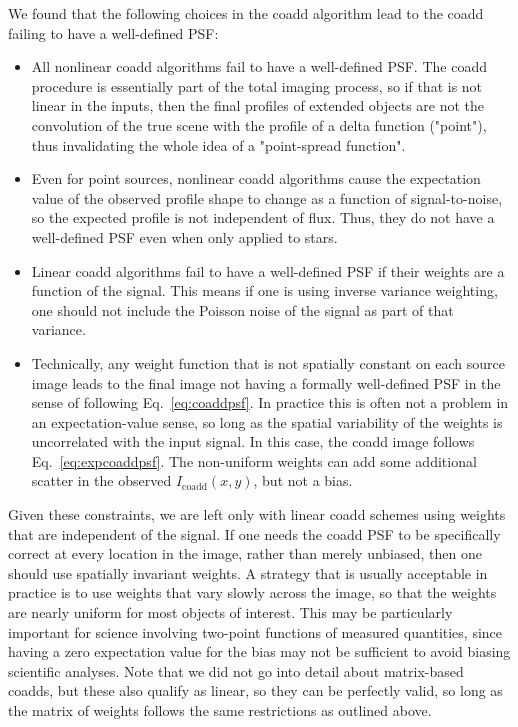 \documentclass{aastex63}
\newcommand{\irresponse}[1]{{#1}}
\begin{document}
We found that the following choices in the coadd algorithm lead to the coadd failing to
have a well-defined PSF:
\begin{itemize}
    \item All nonlinear coadd algorithms fail to have a well-defined PSF.  The coadd procedure is essentially part of the total imaging process, so if that is not linear in the inputs, then the final profiles of extended objects are not the convolution of the true scene with the profile of a delta function ("point"), thus invalidating the whole idea of a "point-spread function".
    \item Even for point sources, nonlinear coadd algorithms \irresponse{cause the expectation value of the observed profile shape to change} as a function of signal-to-noise, so the expected profile is not independent of flux.  Thus, they do not have a well-defined PSF even when only applied to stars.
    \item Linear coadd algorithms fail to have a well-defined PSF if their weights are a function of the signal.  This means if one is using inverse variance weighting, one should not include the Poisson noise of the signal as part of that variance.
    \item Technically, any weight function that is not spatially constant on each source image leads to the final image not having a formally well-defined PSF in the sense of following Eq.~\eqref{eq:coaddpsf}.  In practice this is \irresponse{often} not a problem in an expectation-value sense, so long as the spatial variability of the weights is uncorrelated with the input signal.  In this case, the coadd image follows Eq.~\eqref{eq:expcoaddpsf}. The non-uniform weights can add some additional scatter in the observed $I_\mathrm{coadd}(x,y)$, but not a bias. 
\end{itemize}

Given these constraints, we are left only with linear coadd schemes using weights that are independent of the signal.  If one needs the coadd PSF to be specifically correct at every location in the image, rather than merely unbiased, then one should use spatially invariant weights. \irresponse{A strategy that is usually acceptable in practice is to use weights that vary slowly across the image, so that the weights are nearly uniform for most objects of interest.  This may be particularly important for science involving two-point functions of measured quantities, since having a zero expectation value for the bias may not be sufficient to avoid biasing scientific analyses.} Note that we did not go into detail about matrix-based coadds, but these also qualify as linear, so they can be perfectly valid, so long as the matrix of weights follows the same restrictions \irresponse{as outlined above}.
\end{document}

